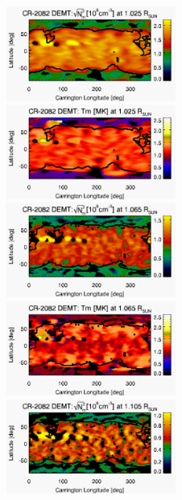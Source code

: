 \documentclass[namedreferences]{solarphysics}
\begin{document}
\begin{article}
\begin{figure}[h!]
\begin{center}
\includegraphics[width=0.495\textwidth]{figs/map_Ne_CR2082_DEMT-EUVI_behind_H1-L3523_r3d_1025_Rsun.pdf}
\includegraphics[width=0.495\textwidth]{figs/map_Tm_CR2082_DEMT-EUVI_behind_H1-L3523_r3d_1025_Rsun.pdf}
\includegraphics[width=0.495\textwidth]{figs/map_Ne_CR2082_DEMT-EUVI_behind_H1-L3523_r3d_1065_Rsun.pdf}
\includegraphics[width=0.495\textwidth]{figs/map_Tm_CR2082_DEMT-EUVI_behind_H1-L3523_r3d_1065_Rsun.pdf}
\includegraphics[width=0.495\textwidth]{figs/map_Ne_CR2082_DEMT-EUVI_behind_H1-L3523_r3d_1105_Rsun.pdf}

\end{center}
\end{figure}
\end{article}
\end{document}
